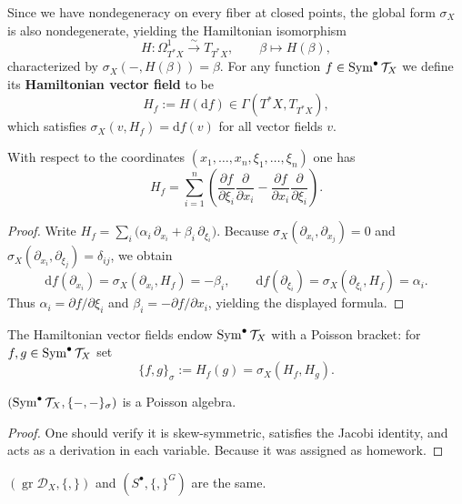 Since we have nondegeneracy on every fiber at closed points, the global form $\sigma_X$ is also nondegenerate, yielding the Hamiltonian isomorphism
\[
    H\colon \Omega^1_{T^\ast X}\xrightarrow{\sim}T_{T^\ast X},\qquad
    \beta\longmapsto H(\beta),
\]
characterized by $\sigma_X(-,H(\beta))=\beta$.  For any function
$f\in \operatorname{Sym}^\bullet \mathcal{T}_X$ we define its \textbf{Hamiltonian vector field} to be
\[
    H_f:=H(\text{d}f)\in \Gamma(T^\ast X,T_{T^\ast X}),
\]
which satisfies $\sigma_X(v,H_f)=\text{d}f(v)$ for all vector fields $v$.

\begin{lemma}\label{lem:hamiltonian-coordinates}
    With respect to the coordinates $(x_1,\dots,x_n,\xi_1,\dots,\xi_n)$ one has
    \[
        H_f = \sum_{i=1}^n
        \left(\frac{\partial f}{\partial \xi_i}\frac{\partial}{\partial x_i}
        -\frac{\partial f}{\partial x_i}\frac{\partial}{\partial \xi_i}
        \right).
    \]
\end{lemma}
\begin{proof}
    Write $H_f=\sum_i \big(\alpha_i\,\partial_{x_i}+\beta_i\,\partial_{\xi_i}\big)$.
    Because $\sigma_X(\partial_{x_i},\partial_{x_j})=0$ and
    $\sigma_X(\partial_{x_i},\partial_{\xi_j})=\delta_{ij}$, we obtain
    \[
        \text{d}f(\partial_{x_i})=\sigma_X(\partial_{x_i},H_f)=-\beta_i,\qquad
        \text{d}f(\partial_{\xi_i})=\sigma_X(\partial_{\xi_i},H_f)=\alpha_i.
    \]
    Thus $\alpha_i=\partial f/\partial \xi_i$ and $\beta_i=-\partial f/\partial
        x_i$, yielding the displayed formula.
\end{proof}

The Hamiltonian vector fields endow $\operatorname{Sym}^\bullet \mathcal{T}_X$ with a Poisson bracket:
for $f,g\in \operatorname{Sym}^\bullet \mathcal{T}_X$ set
\[
    \{f,g\}_\sigma := H_f(g)=\sigma_X(H_f,H_g).
\]

\begin{lemma}
    $(\operatorname{Sym}^\bullet \mathcal{T}_X,\{-,-\}_\sigma)$ is a Poisson algebra.
\end{lemma}
\begin{proof}
    One should verify it is skew-symmetric, satisfies the Jacobi identity, and acts as a derivation
    in each variable. Because it was assigned as homework.
\end{proof}

\begin{lemma}
    $(\operatorname{gr}\mathcal{D}_X, \{, \})$ and $(S^\bullet, \{, \}^G)$ are the same.
\end{lemma}

